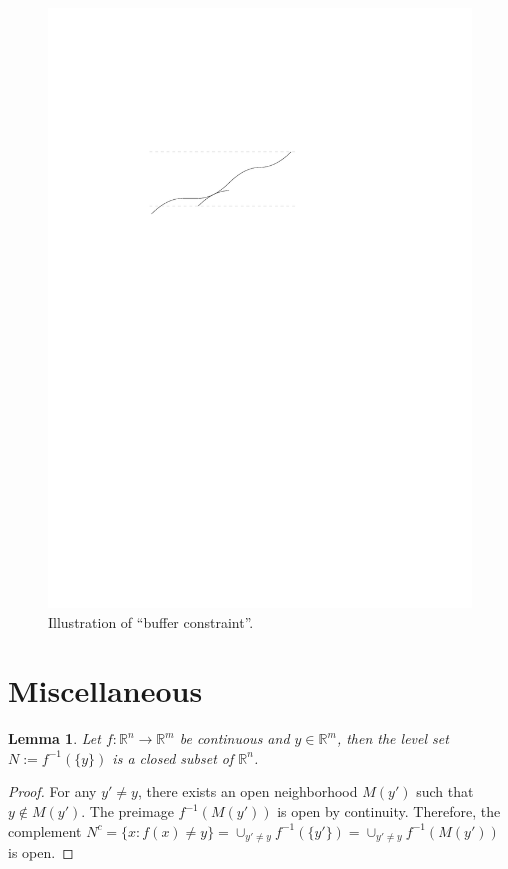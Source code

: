 \documentclass[a4paper]{article}
\theoremstyle{definition}
\theoremstyle{plain}
\newtheorem{lemma}{Lemma\hspace{0.25em}\ignorespaces}
\begin{document}
\begin{figure}
  \centering
  \includegraphics[scale=1]{figures/motion/rough/bufferconstraint}
  \caption{Illustration of ``buffer constraint''.}%
  \label{fig:bufferconstraint}
\end{figure}


\newpage
\appendix
\section{Miscellaneous}

\begin{lemma}\label{lemma:levelset}
  Let $f :\mathbb{R}^{n} \rightarrow \mathbb{R}^{m}$ be continuous and
  $y \in \mathbb{R}^{m}$, then the level set $N := f^{-1}(\{ y \})$ is a closed
  subset of $\mathbb{R}^{n}$.
\end{lemma}
\begin{proof}
  For any $y' \neq y$, there exists an open neighborhood $M(y')$ such that
  $y \notin M(y')$. The preimage $f^{-1}(M(y'))$ is open by continuity.
  Therefore, the complement
  $N^{c} = \{ x : f(x) \neq y \} = \cup_{y' \neq y} f^{-1}(\{y'\}) = \cup_{y' \neq y} f^{-1}(M(y'))$
  is open.
\end{proof}
\end{document}
